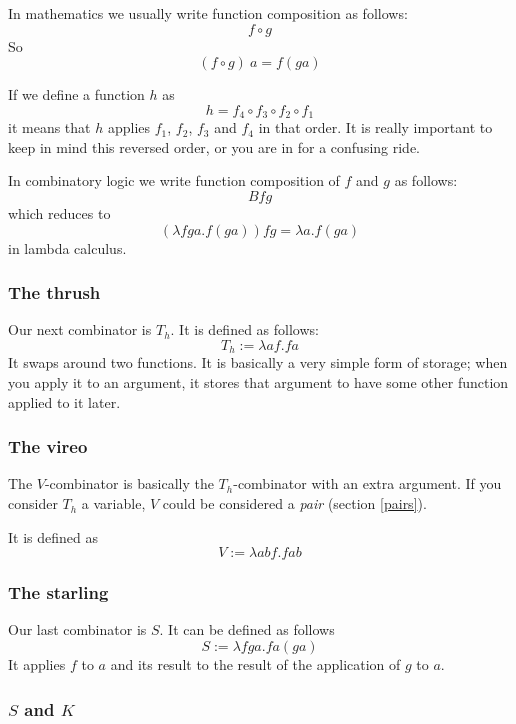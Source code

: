 \documentclass[11pt]{article}
\begin{document}
In mathematics we usually write function composition as follows:
\[f\circ g\]
So
\[(f\circ g)\ a=f(ga)\]

If we define a function \(h\) as
\[h=f_4\circ f_3\circ f_2\circ f_1\]
it means that \(h\) applies \(f_1\), \(f_2\), \(f_3\) and \(f_4\) in that
order. It is really important to keep in mind this reversed order, or you are in
for a confusing ride.

In combinatory logic we write function composition of \(f\) and \(g\) as
follows:
\[Bfg\]
which reduces to
\[(\lambda fga.f(ga))fg=\lambda a.f(ga)\]
in lambda calculus.

\subsubsection{The thrush}\label{thrush}

Our next combinator is \(T_{h}\). It is defined as follows:
\[T_{h}:=\lambda af.fa\]
It swaps around two functions. It is basically a very simple form of storage;
when you apply it to an argument, it stores that argument to have some other
function applied to it later.


\subsubsection{The vireo}\label{vireo}

The \(V\)-combinator is basically the \(T_h\)-combinator with an extra
argument. If you consider \(T_h\) a variable, \(V\) could be considered a
\emph{pair} (section \ref{pairs}).

It is defined as
\[V:=\lambda abf.fab\]

\subsubsection{The starling}

Our last combinator is \(S\). It can be defined as follows
\[S:=\lambda fga.fa(ga)\]
It applies \(f\) to \(a\) and its result to the result of the application of
\(g\) to \(a\).

\subsubsection{\(S\) and \(K\)}

\end{document}
